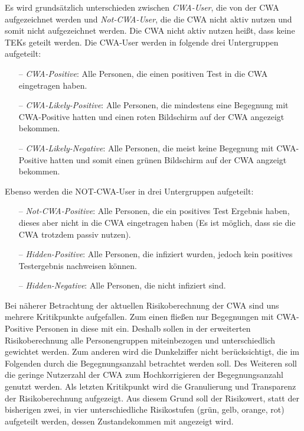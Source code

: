 \documentclass[conference,compsoc]{IEEEtran}
\begin{document}
Es wird grundsätzlich unterschieden zwischen \textit{CWA-User}, die von der CWA aufgezeichnet werden und \textit{Not-CWA-User}, 
die die CWA nicht aktiv nutzen und somit nicht aufgezeichnet werden. Die CWA nicht aktiv nutzen heißt, dass keine TEKs geteilt werden.
Die CWA-User werden in folgende drei Untergruppen aufgeteilt:
\begin{itemize}
\item[--]\textit{CWA-Positive}: Alle Personen, die einen positiven Test in die CWA eingetragen haben.
\item[--]\textit{CWA-Likely-Positive}: Alle Personen, die mindestens eine Begegnung mit CWA-Positive hatten und einen roten Bildschirm auf der CWA angezeigt bekommen.
\item[--]\textit{CWA-Likely-Negative}: Alle Personen, die meist keine Begegnung mit CWA-Positive hatten und somit einen grünen Bildschirm auf der CWA angzeigt bekommen.
\end{itemize}
Ebenso werden die NOT-CWA-User in drei Untergruppen aufgeteilt: 
\begin{itemize}
\item[--]\textit{Not-CWA-Positive}: Alle Personen, die ein positives Test Ergebnis haben, dieses aber nicht in die CWA eingetragen haben (Es ist möglich, dass sie die CWA trotzdem passiv nutzen).
\item[--]\textit{Hidden-Positive}: Alle Personen, die infiziert wurden, jedoch kein positives Testergebnis nachweisen können. 
\item[--]\textit{Hidden-Negative}: Alle Personen, die nicht infiziert sind.
\end{itemize}

Bei näherer Betrachtung der aktuellen Risikoberechnung der CWA sind uns mehrere Kritikpunkte aufgefallen.
Zum einen fließen nur Begegnungen mit CWA-Positive Personen in diese mit ein.
Deshalb sollen in der erweiterten Risikoberechnung alle Personengruppen miteinbezogen und unterschiedlich gewichtet werden.
Zum anderen wird die Dunkelziffer nicht berücksichtigt, die im Folgenden durch die Begegnungsanzahl betrachtet werden soll.
Des Weiteren soll die geringe Nutzerzahl der CWA zum Hochkorrigieren der Begegnungsanzahl genutzt werden.
Als letzten Kritikpunkt wird die Granulierung und Transparenz der Risikoberechnung aufgezeigt. 
Aus diesem Grund soll der Risikowert, statt der bisherigen zwei, in vier unterschiedliche Risikostufen (grün, gelb, orange, rot) aufgeteilt werden, dessen Zustandekommen mit angezeigt wird.
\end{document}
